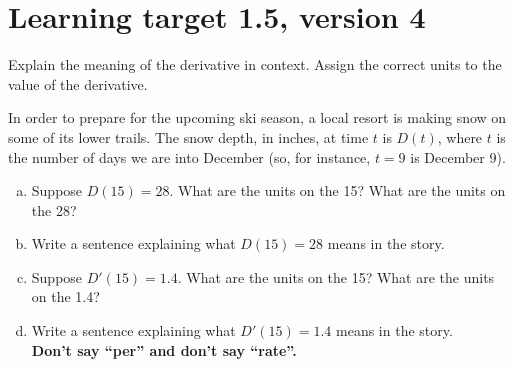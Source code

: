 \pagebreak

\section{Learning target 1.5, version 4}

Explain the meaning of the derivative in context. Assign the correct units to the value of the derivative.

\hrulefill

In order to prepare for the upcoming ski season, a local resort is making snow on some of its lower trails. The snow depth, in inches, at time $t$ is $D(t)$, where $t$ is the number of days we are into December (so, for instance, $t=9$ is December 9). 

\begin{enumerate}[(a)]
\item Suppose $D(15)=28$. What are the units on the 15? What are the units on the 28?
\vfill
\item Write a sentence explaining what $D(15)=28$ means in the story.
\vfill

\item Suppose $D'(15) = 1.4$. What are the units on the 15? What are the units on the 1.4?
\vfill
\item Write a sentence explaining what $D'(15) = 1.4$ means in the story.\\
\textbf{Don't say ``per'' and don't say ``rate''.}

\vfill
\end{enumerate}

